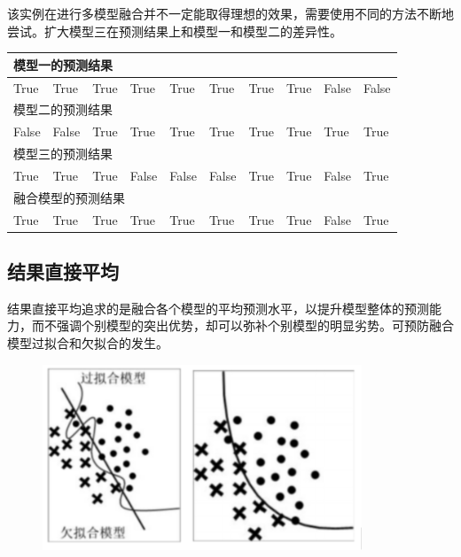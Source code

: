 \documentclass[openbib]{article}
\begin{document}
该实例在进行多模型融合并不一定能取得理想的效果，需要使用不同的方法不断地尝试。扩大模型三在预测结果上和模型一和模型二的差异性。

\begin{table}[htbp]
	\begin{tabular}{|l|l|l|l|l|l|l|l|l|l|}
		\hline
		\multicolumn{10}{|l|}{模型一的预测结果}                                            \\ \hline
		True  & True  & True & True  & True  & True  & True & True & False & False \\ \hline
		\multicolumn{10}{|l|}{模型二的预测结果}                                            \\ \hline
		False & False & True & True  & True  & True  & True & True & True  & True  \\ \hline
		\multicolumn{10}{|l|}{模型三的预测结果}                                            \\ \hline
		True  & True  & True & False & False & False & True & True & False & True  \\ \hline
		\multicolumn{10}{|l|}{融合模型的预测结果}                                           \\ \hline
		True  & True  & True & True  & True  & True  & True & True & False & True  \\ \hline
	\end{tabular}
\end{table}
\subsection{结果直接平均}
结果直接平均追求的是融合各个模型的平均预测水平，以提升模型整体的预测能力，而不强调个别模型的突出优势，却可以弥补个别模型的明显劣势。可预防融合模型过拟合和欠拟合的发生。

\begin{figure}[htbp]
	\centering
	\includegraphics[scale=0.6]{9-1}
\end{figure}
\end{document}
